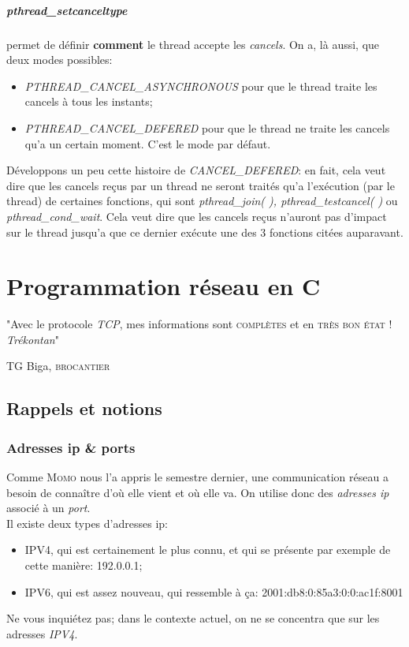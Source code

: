 \documentclass{report}
\begin{document}
\paragraph{pthread\_setcanceltype} permet de définir \textbf{comment} le thread accepte les \emph{cancels}. On a, là aussi, que deux modes possibles:
\begin{itemize}
\item{\emph{PTHREAD\_CANCEL\_ASYNCHRONOUS} pour que le thread traite les cancels à tous les instants;}
\item{\emph{PTHREAD\_CANCEL\_DEFERED} pour que le thread ne traite les cancels qu'a un certain moment. C'est le mode par défaut.}
\end{itemize}
Développons un peu cette histoire de \emph{CANCEL\_DEFERED}: en fait, cela veut dire que les cancels reçus par un thread ne seront traités qu'a l'exécution (par le thread) de certaines fonctions, qui sont \emph{pthread\_join( ), pthread\_testcancel( )} ou \emph{pthread\_cond\_wait}. Cela veut dire que les cancels reçus n'auront pas d'impact sur le thread jusqu'a que ce dernier exécute une des 3 fonctions citées auparavant.



\chapter{Programmation réseau en C}

\epigraph{"Avec le protocole \emph{TCP}, mes informations sont \textsc{complètes} et en \textsc{très bon état} ! \emph{Trékontan}"}{TG Biga, \textsc{brocantier}}

\section{Rappels et notions}
\subsection{Adresses ip \& ports}
Comme \textsc{Momo} nous l'a appris le semestre dernier, une communication réseau a besoin de connaître d'où elle vient et où elle va. On utilise donc des \emph{adresses ip} associé à un \emph{port}.\\
Il existe deux types d'adresses ip:
\begin{itemize}
\item{IPV4, qui est certainement le plus connu, et qui se présente par exemple de cette manière: 192.0.0.1;}
\item{IPV6, qui est assez nouveau, qui ressemble à ça: 2001:db8:0:85a3:0:0:ac1f:8001} 
\end{itemize}
Ne vous inquiétez pas; dans le contexte actuel, on ne se concentra que sur les adresses \emph{IPV4}.
\end{document}
